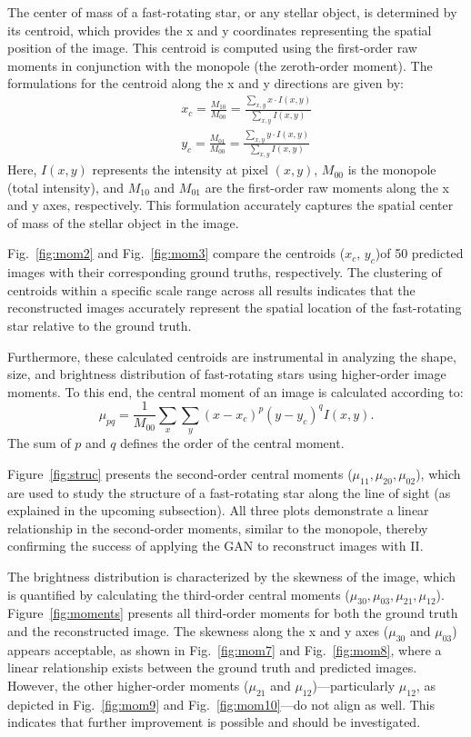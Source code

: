 \documentclass[fleqn,usenatbib,twocolumn]{mnras}
\begin{document}
The center of mass of a fast-rotating star, or any stellar object, is determined by its centroid, which provides the x and y coordinates representing the spatial position of the image. This centroid is computed using the first-order raw moments in conjunction with the monopole (the zeroth-order moment). The formulations for the centroid along the x and y directions are given by:
\begin{eqnarray}
&&x_c = \frac{M_{10}}{M_{00}} = \frac{\sum_{x,y} x \cdot I(x,y)}{\sum_{x,y} I(x,y)} \nonumber \\
&&y_c = \frac{M_{01}}{M_{00}} = \frac{\sum_{x,y} y \cdot I(x,y)}{\sum_{x,y} I(x,y)}
\end{eqnarray}
Here, \(I(x,y)\) represents the intensity at pixel \((x,y)\), \(M_{00}\) is the monopole (total intensity), and \(M_{10}\) and \(M_{01}\) are the first-order raw moments along the x and y axes, respectively. This formulation accurately captures the spatial center of mass of the stellar object in the image.

Fig.~\ref{fig:mom2} and Fig.~\ref{fig:mom3} compare the centroids ($x_{c}$, $y_{c}$)of 50 predicted images with their corresponding ground truths, respectively. The clustering of centroids within a specific scale range across all results indicates that the reconstructed images accurately represent the spatial location of the fast-rotating star relative to the ground truth.

Furthermore, these calculated centroids are instrumental in analyzing the shape, size, and brightness distribution of fast-rotating stars using higher-order image moments. To this end, the central moment of an image is calculated according to:
\begin{equation}
	\mu_{pq} = \frac{1}{M_{00}}\sum_{x} \sum_{y} (x - x_c)^p (y - y_c)^q I(x, y).
\end{equation}
The sum of \(p\) and \(q\) defines the order of the central moment. 

Figure~\ref{fig:struc} presents the second-order central moments (\(\mu_{11}, \mu_{20}, \mu_{02}\)), which are used to study the structure of a fast-rotating star along the line of sight (as explained in the upcoming subsection). All three plots demonstrate a linear relationship in the second-order moments, similar to the monopole, thereby confirming the success of applying the GAN to reconstruct images with II.

The brightness distribution is characterized by the skewness of the image, which is quantified by calculating the third-order central moments (\(\mu_{30}, \mu_{03}, \mu_{21}, \mu_{12}\)). Figure~\ref{fig:moments} presents all third-order moments for both the ground truth and the reconstructed image. The skewness along the x and y axes (\(\mu_{30}\) and \(\mu_{03}\)) appears acceptable, as shown in Fig.~\ref{fig:mom7} and Fig.~\ref{fig:mom8}, where a linear relationship exists between the ground truth and predicted images. However, the other higher-order moments (\(\mu_{21}\) and \(\mu_{12}\))—particularly \(\mu_{12}\), as depicted in Fig.~\ref{fig:mom9} and Fig.~\ref{fig:mom10}—do not align as well. This indicates that further improvement is possible and should be investigated.
\end{document}
